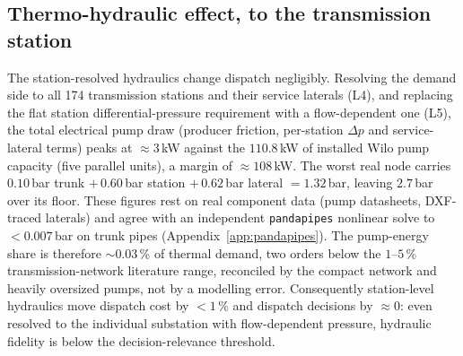 \documentclass[a4paper,fleqn]{cas-sc}
\begin{document}
\subsection{Thermo-hydraulic effect, to the transmission station}\label{subsec:hydraulics}
The station-resolved hydraulics change dispatch negligibly. Resolving the demand side
to all 174 transmission stations and their service laterals (L4), and replacing the
flat station differential-pressure requirement with a flow-dependent one (L5), the
total electrical pump draw (producer friction, per-station $\Delta p$ and
service-lateral terms) peaks at $\approx 3$\,kW against the $110.8$\,kW of installed
Wilo pump capacity (five parallel units), a margin of $\approx 108$\,kW. The worst
real node carries $0.10$\,bar trunk $+\,0.60$\,bar station $+\,0.62$\,bar lateral
$=1.32$\,bar, leaving $2.7$\,bar over its floor. These figures rest on real component
data (pump datasheets, DXF-traced laterals) and agree with an independent
\texttt{pandapipes} nonlinear solve to $<0.007$\,bar on trunk pipes
(Appendix~\ref{app:pandapipes}). The pump-energy share is therefore $\sim\!0.03$\,\%
of thermal demand, two orders below the $1$--$5$\,\% transmission-network literature
range, reconciled by the compact network and heavily oversized pumps, not by a
modelling error. Consequently station-level hydraulics move dispatch cost by $<1$\,\%
and dispatch decisions by $\approx 0$: even resolved to the individual substation with
flow-dependent pressure, hydraulic fidelity is below the decision-relevance threshold.

\end{document}
